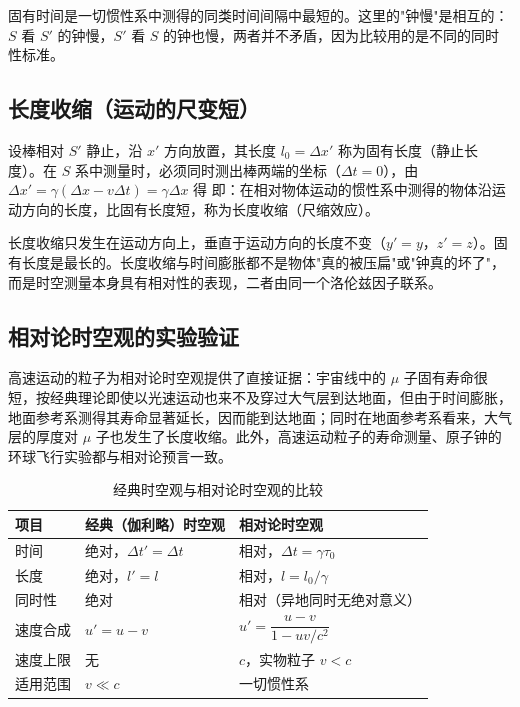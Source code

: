     固有时间是一切惯性系中测得的同类时间间隔中最短的。这里的"钟慢"是相互的：$S$ 看 $S'$ 的钟慢，$S'$ 看 $S$ 的钟也慢，两者并不矛盾，因为比较用的是不同的同时性标准。

    \subsection{长度收缩（运动的尺变短）}
    设棒相对 $S'$ 静止，沿 $x'$ 方向放置，其长度 $l_0=\Delta x'$ 称为固有长度（静止长度）。在 $S$ 系中测量时，必须同时测出棒两端的坐标（$\Delta t=0$），由 $\Delta x'=\gamma(\Delta x-v\Delta t)=\gamma\Delta x$ 得
    即：在相对物体运动的惯性系中测得的物体沿运动方向的长度，比固有长度短，称为长度收缩（尺缩效应）。

    长度收缩只发生在运动方向上，垂直于运动方向的长度不变（$y'=y$，$z'=z$）。固有长度是最长的。长度收缩与时间膨胀都不是物体"真的被压扁"或"钟真的坏了"，而是时空测量本身具有相对性的表现，二者由同一个洛伦兹因子联系。

    \subsection{相对论时空观的实验验证}
    高速运动的粒子为相对论时空观提供了直接证据：宇宙线中的 $\mu$ 子固有寿命很短，按经典理论即使以光速运动也来不及穿过大气层到达地面，但由于时间膨胀，地面参考系测得其寿命显著延长，因而能到达地面；同时在地面参考系看来，大气层的厚度对 $\mu$ 子也发生了长度收缩。此外，高速运动粒子的寿命测量、原子钟的环球飞行实验都与相对论预言一致。

    \begin{table}[htbp]
    \centering
    \caption{经典时空观与相对论时空观的比较}
    \begin{tabular}{lll}
    \toprule
    项目 & 经典（伽利略）时空观 & 相对论时空观 \\
    \midrule
    时间 & 绝对，$\Delta t'=\Delta t$ & 相对，$\Delta t=\gamma\tau_0$ \\
    长度 & 绝对，$l'=l$ & 相对，$l=l_0/\gamma$ \\
    同时性 & 绝对 & 相对（异地同时无绝对意义） \\
    速度合成 & $u'=u-v$ & $u'=\dfrac{u-v}{1-uv/c^{2}}$ \\
    速度上限 & 无 & $c$，实物粒子 $v<c$ \\
    适用范围 & $v\ll c$ & 一切惯性系 \\
    \bottomrule
    \end{tabular}
    \end{table}

